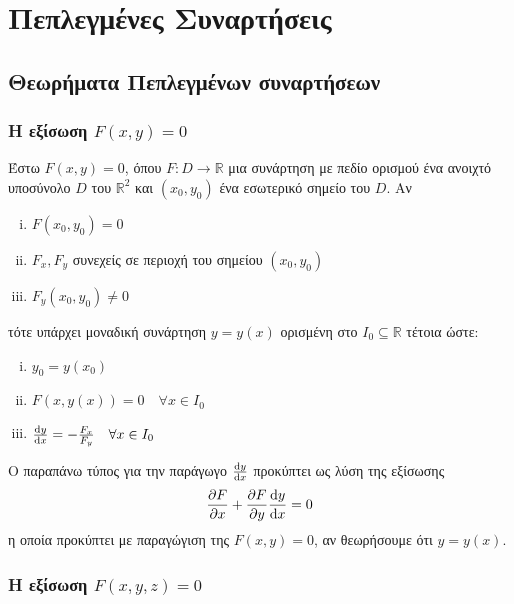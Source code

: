 


\everymath{\displaystyle}



\chapter{Πεπλεγμένες Συναρτήσεις}


\section{Θεωρήματα Πεπλεγμένων συναρτήσεων}

\vspace{\baselineskip}

\subsection{Η εξίσωση $ F(x,y) = 0 $}

Έστω $ F(x,y) = 0 $, όπου $ F\colon D \to \mathbb{R} $ μια συνάρτηση με πεδίο
ορισμού ένα ανοιχτό υποσύνολο $D$ του $\mathbb{R}^{2}$ και $ (x_0,y_0) $ ένα εσωτερικό σημείο του $D$.
Αν 

\begin{enumerate}[(i)]
	\item $F(x_0,y_0) = 0$ 
	\item $ F_x, F_y$ συνεχείς σε περιοχή του σημείου $ (x_0,y_0) $ 
	\item $ F_y(x_0,y_0) \neq 0 $
\end{enumerate}
τότε υπάρχει μοναδική συνάρτηση $ y=y(x) $ ορισμένη στο $ I_0 \subseteq \mathbb{R} $  τέτοια ώστε:
\begin{enumerate}[(i)]
	\item $y_0 = y(x_0)$
	\item $F(x,y(x)) = 0 \quad \forall x \in I_0$
	\item $ \dv{y}{x} = - \frac{F_x}{F_y} \quad \forall x \in I_0  $
\end{enumerate}

\begin{rem}
	Ο παραπάνω τύπος για την παράγωγο $ \dv{y}{x} $ προκύπτει ως λύση της εξίσωσης
	\[
	\pdv{F}{x} + \pdv{F}{y}\dv{y}{x} = 0 
	\] 
	η οποία προκύπτει με παραγώγιση της $ F(x,y) = 0$, αν θεωρήσουμε ότι $ y=y(x) $.
	
\end{rem}

\subsection{Η εξίσωση $ F(x,y,z) = 0 $}


